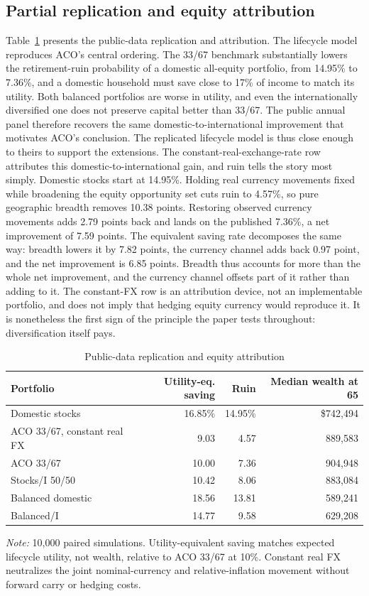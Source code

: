 \documentclass[11pt]{article}
\begin{document}
\subsection{Partial replication and equity attribution}

Table~\ref{tab:currency} presents the public-data replication and attribution.
The lifecycle model reproduces ACO's central ordering. The 33/67 benchmark
substantially lowers the retirement-ruin probability of a domestic all-equity
portfolio, from 14.95\% to 7.36\%, and a domestic household must save close to
17\% of income to match its utility. Both balanced portfolios are worse in
utility, and even the internationally diversified one does not preserve capital
better than 33/67. The public annual panel therefore recovers the same
domestic-to-international improvement that motivates ACO's conclusion. The
replicated lifecycle model is thus close enough to theirs to support the
extensions. The constant-real-exchange-rate row attributes this
domestic-to-international gain, and ruin tells the story most simply. Domestic
stocks start at 14.95\%. Holding real currency movements fixed while broadening
the equity opportunity set cuts ruin to 4.57\%, so pure geographic breadth
removes 10.38 points. Restoring observed currency movements adds 2.79 points
back and lands on the published 7.36\%, a net improvement of 7.59 points. The
equivalent saving rate decomposes the same way: breadth lowers it by 7.82
points, the currency channel adds back 0.97 point, and the net improvement is
6.85 points. Breadth thus accounts
for more than the whole net improvement, and the currency channel offsets part
of it rather than adding to it. The constant-FX row is an attribution device, not an
implementable portfolio, and does not imply that hedging equity currency would
reproduce it. It is nonetheless the first sign of the principle the paper tests
throughout: diversification itself pays.
\begin{table}[t]
\centering
\caption{Public-data replication and equity attribution}
\label{tab:currency}
\begin{tabular}{lrrr}
\toprule
Portfolio & Utility-eq. saving & Ruin & Median wealth at 65 \\
\midrule
Domestic stocks & 16.85\% & 14.95\% & \$742,494 \\
ACO 33/67, constant real FX & 9.03 & 4.57 & 889,583 \\
ACO 33/67 & 10.00 & 7.36 & 904,948 \\
Stocks/I 50/50 & 10.42 & 8.06 & 883,084 \\
Balanced domestic & 18.56 & 13.81 & 589,241 \\
Balanced/I & 14.77 & 9.58 & 629,208 \\
\bottomrule
\end{tabular}
\begin{minipage}{0.94\textwidth}\footnotesize
\textit{Note:} 10,000 paired simulations. Utility-equivalent saving matches
expected lifecycle utility, not wealth, relative to ACO 33/67 at 10\%.
Constant real FX neutralizes the joint nominal-currency and
relative-inflation movement without forward carry or hedging costs.
\end{minipage}
\end{table}
\end{document}
